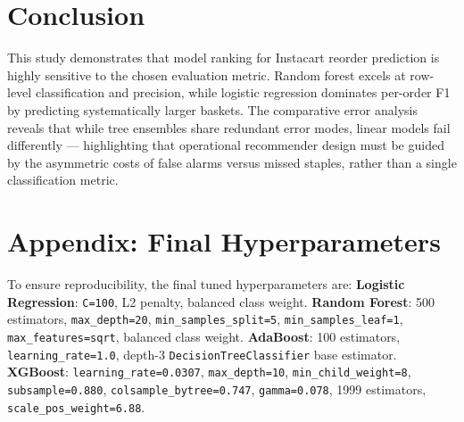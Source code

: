 \documentclass[10pt,twocolumn]{article}
\begin{document}
\section{Conclusion}

This study demonstrates that model ranking for Instacart reorder prediction is highly sensitive to the chosen evaluation metric. Random forest excels at row-level classification and precision, while logistic regression dominates per-order F1 by predicting systematically larger baskets. The comparative error analysis reveals that while tree ensembles share redundant error modes, linear models fail differently --- highlighting that operational recommender design must be guided by the asymmetric costs of false alarms versus missed staples, rather than a single classification metric.

\section*{Appendix: Final Hyperparameters}

To ensure reproducibility, the final tuned hyperparameters are: \textbf{Logistic Regression}: \texttt{C=100}, L2 penalty, balanced class weight. \textbf{Random Forest}: 500 estimators, \texttt{max\_depth=20}, \texttt{min\_samples\_split=5}, \texttt{min\_samples\_leaf=1}, \texttt{max\_features=sqrt}, balanced class weight. \textbf{AdaBoost}: 100 estimators, \texttt{learning\_rate=1.0}, depth-3 \texttt{DecisionTreeClassifier} base estimator. \textbf{XGBoost}: \texttt{learning\_rate=0.0307}, \texttt{max\_depth=10}, \texttt{min\_child\_weight=8}, \texttt{subsample=0.880}, \texttt{colsample\_bytree=0.747}, \texttt{gamma=0.078}, 1999 estimators, \texttt{scale\_pos\_weight=6.88}.

\balance
\setlength{\bibsep}{0.5pt plus 0.1ex}
{\scriptsize

}
\end{document}
